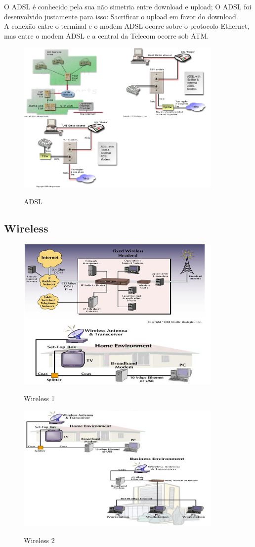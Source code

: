 \documentclass{article}
\begin{document}
O ADSL é conhecido pela sua não simetria entre download e upload; O ADSL foi
desenvolvido justamente para isso: Sacrificar o upload em favor do download.\\
A conexão entre o terminal e o modem ADSL ocorre sobre o protocolo Ethernet, mas
entre o modem ADSL e a central da Telecom ocorre sob ATM.
\begin{figure}[h]
    \center
    \includegraphics[width=10cm]{imagens/adsl.png}
    \label{adsl}
    \caption{ADSL}
\end{figure}


\subsection{Wireless}

\begin{figure}[h]
    \center
    \includegraphics[width=10cm]{imagens/wireless.png}
    \label{wireless}
    \caption{Wireless 1}
\end{figure}
\begin{figure}[h]
    \center
    \includegraphics[width=10cm]{imagens/wireless2.png}
    \label{wireless2}
    \caption{Wireless 2}
\end{figure}
\end{document}
